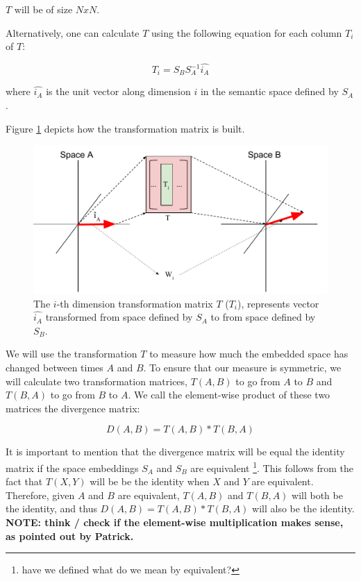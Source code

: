 \documentclass{article} %
\begin{document}
$T$ will be of size $NxN$.

Alternatively, one can calculate $T$ using the following equation for each column $T_i$ of $T$:

$$T_i = S_B S_A^{-1} \widehat{i_A} $$

where $\widehat{i_A}$ is the unit vector along dimension $i$ in the semantic space defined by $S_A$.

Figure \ref{fig:transform} depicts how the transformation matrix is built.

\begin{figure}
 \includegraphics[width=\textwidth]{transformMatrix.pdf} 
 \caption{The $i$-th dimension transformation matrix $T$ ($T_i$), represents vector $\widehat{i_A}$ transformed from space defined by $S_A$ to from space defined by $S_B$.}
 \label{fig:transform}
\end{figure}

We will use the transformation $T$ to measure how much the embedded space has changed between times $A$ and $B$. To ensure that our measure is symmetric, we will calculate two transformation matrices, $T(A,B)$ to go from $A$ to $B$ and $T(B,A)$ to go from $B$ to $A$. We call the element-wise product of these two matrices the divergence matrix:

$$D(A,B) = T(A,B) * T(B,A)$$

It is important to mention that the divergence matrix will be equal the identity matrix if the space embeddings $S_A$ and $S_B$ are equivalent \footnote{have we defined what do we mean by equivalent?}. This follows from the fact that $T(X,Y)$ will be be the identity when $X$ and $Y$ are equivalent. Therefore, given $A$ and $B$ are equivalent, $T(A,B)$ and $T(B,A)$ will both be the identity, and thus $D(A,B) = T(A,B) * T(B,A)$ will also be the identity. \textbf{NOTE: think / check if the element-wise multiplication makes sense, as pointed out by Patrick.}
\end{document}

